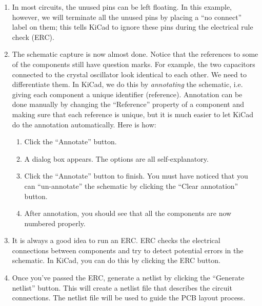 \documentclass[12pt,letterpaper]{scrartcl}
\begin{document}
\begin{enumerate}
	\item In most circuits, the unused pins can be left floating. In this example, however, we will terminate all the unused pins by placing a ``no connect'' label on them; this tells KiCad to ignore these pins during the electrical rule check (ERC).
	
	\item The schematic capture is now almost done. Notice that the references to some of the components still have question marks. For example, the two capacitors connected to the crystal oscillator look identical to each other. We need to differentiate them. In KiCad, we do this by \textit{annotating} the schematic, i.e. giving each component a unique identifier (reference). Annotation can be done manually by changing the ``Reference'' property of a component and making sure that each reference is unique, but it is much easier to let KiCad do the annotation automatically. Here is how:
		\begin{enumerate}
			\item Click the ``Annotate'' button. 
			\item A dialog box appears. The options are all self-explanatory. 
		
			\item Click the ``Annotate'' button to finish. You must have noticed that you can ``un-annotate'' the schematic by clicking the ``Clear annotation'' button. 
			
			\item After annotation, you should see that all the components are now numbered properly. 
		\end{enumerate}
		
	\item It is always a good idea to run an ERC. ERC checks the electrical connections between components and try to detect potential errors in the schematic. In KiCad, you can do this by clicking the ERC button. 
	
	\item Once you've passed the ERC, generate a netlist by clicking the ``Generate netlist'' button. This will create a netlist file that describes the circuit connections. The netlist file will be used to guide the PCB layout process.
	

\end{enumerate}
\end{document}
